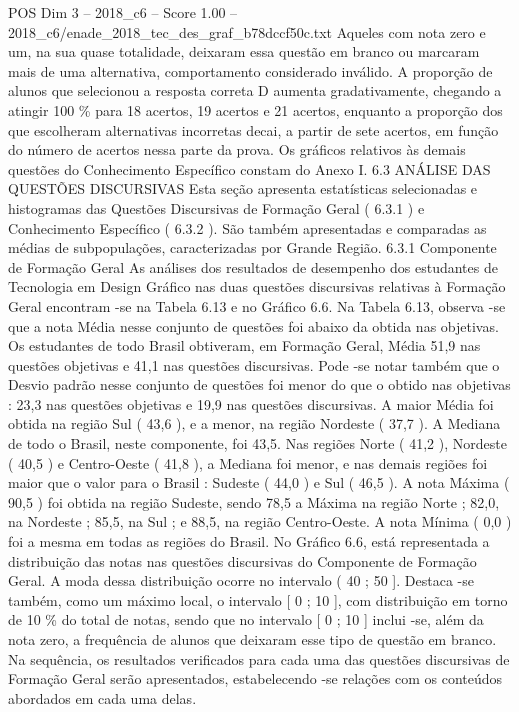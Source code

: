 \begin{textsample}{POS Dim 3 – 2018\_c6 – Score 1.00 – 2018\_c6/enade\_2018\_tec\_des\_graf\_b78dccf50c.txt}
Aqueles com nota zero e um, na sua quase totalidade, deixaram essa questão em branco ou marcaram mais de uma alternativa, comportamento considerado inválido.
A proporção de alunos que selecionou a resposta correta D aumenta gradativamente, chegando a atingir 100 \% para 18 acertos, 19 acertos e 21 acertos, enquanto a proporção dos que escolheram alternativas incorretas decai, a partir de sete acertos, em função do número de acertos nessa parte da prova.
Os gráficos relativos às demais questões do Conhecimento Específico constam do Anexo I. 6.3 ANÁLISE DAS QUESTÕES DISCURSIVAS Esta seção apresenta estatísticas selecionadas e histogramas das Questões Discursivas de Formação Geral ( 6.3.1 ) e Conhecimento Específico ( 6.3.2 ).
São também apresentadas e comparadas as médias de subpopulações, caracterizadas por Grande Região. 6.3.1 Componente de Formação Geral As análises dos resultados de desempenho dos estudantes de Tecnologia em Design Gráfico nas duas questões discursivas relativas à Formação Geral encontram -se na Tabela 6.13 e no Gráfico 6.6.
Na Tabela 6.13, observa -se que a nota Média nesse conjunto de questões foi abaixo da obtida nas objetivas.
Os estudantes de todo Brasil obtiveram, em Formação Geral, Média 51,9 nas questões objetivas e 41,1 nas questões discursivas.
Pode -se notar também que o Desvio padrão nesse conjunto de questões foi menor do que o obtido nas objetivas : 23,3 nas questões objetivas e 19,9 nas questões discursivas.
A maior Média foi obtida na região Sul ( 43,6 ), e a menor, na região Nordeste ( 37,7 ).
A Mediana de todo o Brasil, neste componente, foi 43,5.
Nas regiões Norte ( 41,2 ), Nordeste ( 40,5 ) e Centro-Oeste ( 41,8 ), a Mediana foi menor, e nas demais regiões foi maior que o valor para o Brasil : Sudeste ( 44,0 ) e Sul ( 46,5 ).
A nota Máxima ( 90,5 ) foi obtida na região Sudeste, sendo 78,5 a Máxima na região Norte ; 82,0, na Nordeste ; 85,5, na Sul ; e 88,5, na região Centro-Oeste.
A nota Mínima ( 0,0 ) foi a mesma em todas as regiões do Brasil.
No Gráfico 6.6, está representada a distribuição das notas nas questões discursivas do Componente de Formação Geral.
A moda dessa distribuição ocorre no intervalo ( 40 ; 50 ].
Destaca -se também, como um máximo local, o intervalo [ 0 ; 10 ], com distribuição em torno de 10 \% do total de notas, sendo que no intervalo [ 0 ; 10 ] inclui -se, além da nota zero, a frequência de alunos que deixaram esse tipo de questão em branco.
Na sequência, os resultados verificados para cada uma das questões discursivas de Formação Geral serão apresentados, estabelecendo -se relações com os conteúdos abordados em cada uma delas.

\end{textsample}
